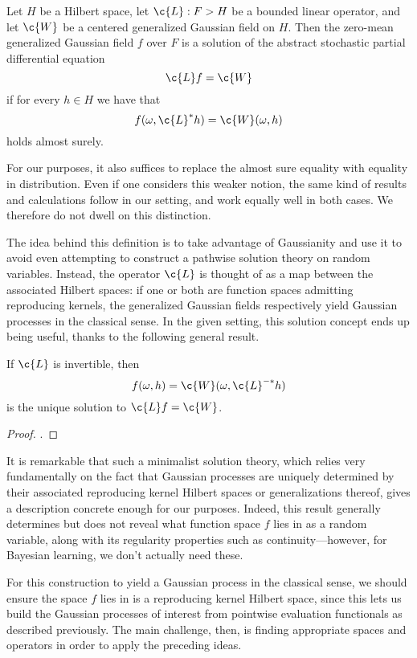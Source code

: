 \documentclass[11pt]{book}
\begin{document}
\begin{definition}
Let $H$ be a Hilbert space, let $\c{L} : F \-> H$ be a bounded linear operator, and let $\c{W}$ be a centered generalized Gaussian field on $H$.
Then the zero-mean generalized Gaussian field $f$ over $F$ is a solution of the abstract stochastic partial differential equation 
\[
\c{L} f = \c{W}    
\]
if for every $h\in H$ we have that 
\[
f(\omega,\c{L}^* h) = \c{W}(\omega,h)
\]
holds almost surely.
\end{definition}

For our purposes, it also suffices to replace the almost sure equality with equality in distribution. 
Even if one considers this weaker notion, the same kind of results and calculations follow in our setting, and work equally well in both cases.
We therefore do not dwell on this distinction.

The idea behind this definition is to take advantage of Gaussianity and use it to avoid even attempting to construct a pathwise solution theory on random variables.
Instead, the operator $\c{L}$ is thought of as a map between the associated Hilbert spaces: if one or both are function spaces admitting reproducing kernels, the generalized Gaussian fields respectively yield Gaussian processes in the classical sense.
In the given setting, this solution concept ends up being useful, thanks to the following general result.

\begin{result}
If $\c{L}$ is invertible, then
\[
f(\omega,h) = \c{W}(\omega, \c{L}^{-*} h)
\]
is the unique solution to $\c{L}f = \c{W}$.
\end{result}

\begin{proof}
\textcite[Theorem 4.2.2.]{lototsky17}.
\end{proof}

It is remarkable that such a minimalist solution theory, which relies very fundamentally on the fact that Gaussian processes are uniquely determined by their associated reproducing kernel Hilbert spaces or generalizations thereof, gives a description concrete enough for our purposes.
Indeed, this result generally determines but does not reveal what function space $f$ lies in as a random variable, along with its regularity properties such as continuity---however, for Bayesian learning, we don't actually need these.

For this construction to yield a Gaussian process in the classical sense, we should ensure the space $f$ lies in is a reproducing kernel Hilbert space, since this lets us build the Gaussian processes of interest from pointwise evaluation functionals as described previously.
The main challenge, then, is finding appropriate spaces and operators in order to apply the preceding ideas.
\end{document}

